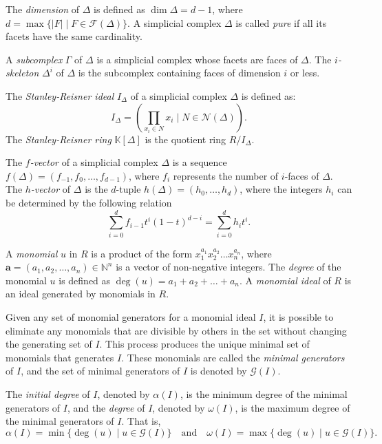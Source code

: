 \documentclass[a4paper,12pt]{amsart}
\numberwithin{equation}{section}
\theoremstyle{definition}
\newcommand{\K}[0]{\mathbb{K}}
\begin{document}
The \emph{dimension} of $\Delta$ is defined as $\dim\Delta=d-1$, where $d=\max\{|F|\mid F\in\mathcal{F}(\Delta)\}$. A simplicial complex $\Delta$ is called \emph{pure} if all its facets have the same cardinality. 

A \emph{subcomplex} $\Gamma$ of $\Delta$ is a simplicial complex whose facets are faces of $\Delta$. The \emph{$i$-skeleton} $\Delta^i$ of $\Delta$ is the subcomplex containing faces of dimension $i$ or less.

The \emph{Stanley-Reisner ideal} $I_\Delta$ of a simplicial complex $\Delta$ is defined as:
$$I_\Delta=\left(\prod_{x_i\in N}x_i\mid N\in\mathcal{N}(\Delta)\right).$$
The \emph{Stanley-Reisner ring} $\K[\Delta]$ is the quotient ring $R/I_{\Delta}$.

The \emph{$f$-vector} of a simplicial complex $\Delta$ is a sequence $f(\Delta)=(f_{-1},f_0,\ldots,f_{d-1})$, where $f_i$ represents the number of $i$-faces of $\Delta$. The \emph{$h$-vector} of $\Delta$ is the $d$-tuple $h(\Delta)=(h_0,\ldots,h_d)$, where the integers $h_i$ can be determined by the following relation $$\sum_{i=0}^{d}f_{i-1}t^i(1-t)^{d-i}=\sum_{i=0}^{d}h_it^i.$$


A \emph{monomial} $u$ in $R$ is a product of the form $x_1^{a_1}x_2^{a_2}\dots x_n^{a_n}$, where $\mathbf{a}=(a_1,a_2,\dots,a_n)\in\mathbb{N}^n$ is a vector of non-negative integers. The \emph{degree} of the monomial $u$ is defined as $\deg(u)=a_1+a_2+\dots+a_n$. A \emph{monomial ideal} of $R$ is an ideal generated by monomials in $R$. 

Given any set of monomial generators for a monomial ideal $I$, it is possible to eliminate any monomials that are divisible by others in the set without changing the generating set of $I$. This process produces the unique minimal set of monomials that generates $I$. These monomials are called the \emph{minimal generators} of $I$, and the set of minimal generators of $I$ is denoted by $\mathcal{G}(I)$.


The \emph{initial degree} of $I$, denoted by $\alpha(I)$, is the minimum degree of the minimal generators of $I$, and the \emph{degree} of $I$, denoted by $\omega(I)$, is the maximum degree of the minimal generators of $I$. That is,  
$$\alpha(I)=\min\{\deg(u)\mid u\in\mathcal{G}(I)\}\quad\text{and}\quad\omega(I)=\max\{\deg(u)\mid u\in\mathcal{G}(I)\}.$$
\end{document}
